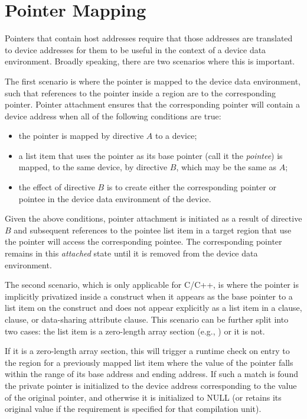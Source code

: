 \pagebreak
\section{Pointer Mapping}
\label{sec:pointer_mapping}

Pointers that contain host addresses require that those addresses are translated to device addresses for them to be useful in the context of a device data environment. Broadly speaking, there are two scenarios where this is important.

The first scenario is where the pointer is mapped to the device data environment, such that references to the pointer inside a  region are to the corresponding pointer. Pointer attachment ensures that the corresponding pointer will contain a device address when all of the following conditions are true:
\begin{itemize}
 \item the pointer is mapped by directive $A$ to a device;
 \item a list item that uses the pointer as its base pointer (call it the \emph{pointee}) is mapped, to the same device, by directive $B$, which may be the same as $A$;
 \item the effect of directive $B$ is to create either the corresponding pointer or pointee in the device data environment of the device.
\end{itemize}

Given the above conditions, pointer attachment is initiated as a result of directive $B$ and subsequent references to the pointee list item in a target region that use the pointer will access the corresponding pointee. The corresponding pointer remains in this \emph{attached} state until it is removed from the device data environment.

The second scenario, which is only applicable for C/C++, is where the pointer is implicitly privatized inside a  construct when it appears as the base pointer to a list item on the construct and does not appear explicitly as a list item in a  clause,  clause, or data-sharing attribute clause. This scenario can be further split into two cases: the list item is a zero-length array section (e.g., ) or it is not.

If it is a zero-length array section, this will trigger a runtime check on entry to the  region for a previously mapped list item where the value of the pointer falls within the range of its base address and ending address. If such a match is found the private pointer is initialized to the device address corresponding to the value of the original pointer, and otherwise it is initialized to NULL (or retains its original value if the  requirement is specified for that compilation unit).

